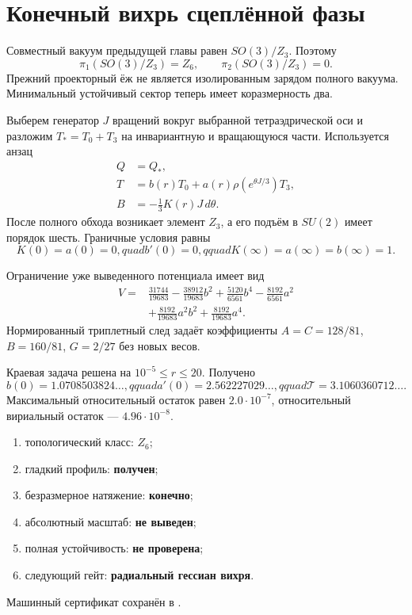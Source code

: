 \chapter{Конечный вихрь сцеплённой фазы}

Совместный вакуум предыдущей главы равен $SO(3)/Z_3$. Поэтому
\begin{equation}
 \pi_1(SO(3)/Z_3)=Z_6,
 \qquad \pi_2(SO(3)/Z_3)=0.
\end{equation}
Прежний проекторный ёж не является изолированным зарядом полного
вакуума. Минимальный устойчивый сектор теперь имеет коразмерность два.

Выберем генератор $J$ вращений вокруг выбранной тетраэдрической оси и
разложим $T_*=T_0+T_3$ на инвариантную и вращающуюся части. Используется
анзац
\begin{align}
 Q&=Q_*,\\
 T&=b(r)T_0+a(r)\rho(e^{\theta J/3})T_3,\\
 B&=-\frac13K(r)J\,d\theta.
\end{align}
После полного обхода возникает элемент $Z_3$, а его подъём в $SU(2)$
имеет порядок шесть. Граничные условия равны
\begin{equation}
 K(0)=a(0)=0,quad b'(0)=0,qquad
 K(\infty)=a(\infty)=b(\infty)=1.
\end{equation}

Ограничение уже выведенного потенциала имеет вид
\begin{equation}
\begin{split}
V={}&\frac{31744}{19683}-\frac{38912}{19683}b^2
+\frac{5120}{6561}b^4-\frac{8192}{6561}a^2\\
&+\frac{8192}{19683}a^2b^2+\frac{8192}{19683}a^4.
\end{split}
\end{equation}
Нормированный триплетный след задаёт коэффициенты
$A=C=128/81$, $B=160/81$, $G=2/27$ без новых весов.

Краевая задача решена на $10^{-5}\le r\le20$. Получено
\begin{equation}
 b(0)=1.0708503824\ldots,qquad
 a'(0)=2.562227029\ldots,qquad
 \mathcal T=3.1060360712\ldots.
\end{equation}
Максимальный относительный остаток равен $2.0\cdot10^{-7}$, относительный
вириальный остаток --- $4.96\cdot10^{-8}$.

\begin{protocol}
\begin{enumerate}
 \item топологический класс: \textbf{$Z_6$};
 \item гладкий профиль: \textbf{получен};
 \item безразмерное натяжение: \textbf{конечно};
 \item абсолютный масштаб: \textbf{не выведен};
 \item полная устойчивость: \textbf{не проверена};
 \item следующий гейт: \textbf{радиальный гессиан вихря}.
\end{enumerate}
\end{protocol}

Машинный сертификат сохранён в
.